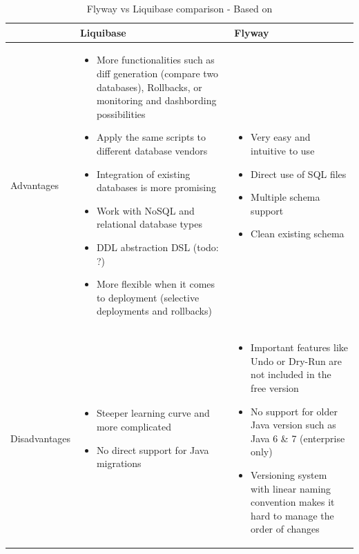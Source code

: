 \begin{table}[H]
	\centering
		    \begin{tabular}{|l|p{}|p{}|}
		    \hline
			 & Liquibase & Flyway\\ \hline
			 \begin{turn}{-90}Advantages\end{turn} &
			\begin{itemize}
				\item More functionalities such as diff generation (compare two databases), Rollbacks, or monitoring and dashbording possibilities
				\item Apply the same scripts to different database vendors
				\item Integration of existing databases is more promising
				\item Work with NoSQL and relational database types
				\item DDL abstraction DSL (todo: ?)
				\item More flexible when it comes to deployment (selective deployments and rollbacks)
			\end{itemize} & \begin{itemize}
				\item Very easy and intuitive to use
				\item Direct use of SQL files
				\item Multiple schema support
				\item Clean existing schema
			\end{itemize}\\ \hline
		
	 \begin{turn}{-90}Disadvantages\end{turn} &
		\begin{itemize}
			\item Steeper learning curve and more complicated 
			\item No direct support for Java migrations
		\end{itemize} & \begin{itemize}
			\item Important features like Undo or Dry-Run are not included in the free version 
			\item No support for older Java version such as Java 6 \& 7 (enterprise only)
			\item Versioning system with linear naming convention makes it hard to manage the order of changes
		\end{itemize}\\ \hline
		\end{tabular}
	\caption{Flyway vs Liquibase comparison - Based on \cite{Parsick2018, Kaps2016}}
	\label{tab:flyway_liquivase_conparison}
\end{table}

